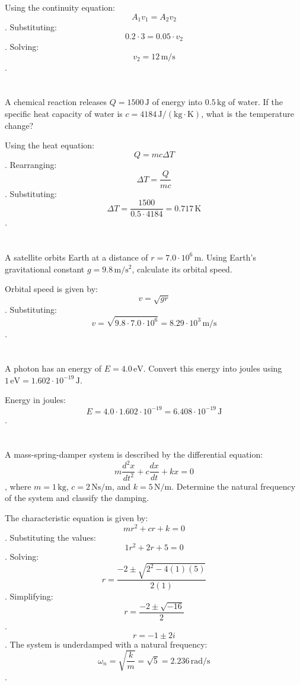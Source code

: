 \documentclass{article}
\begin{document}
Using the continuity equation: \[ A_1 v_1 = A_2 v_2 \]. Substituting: \[ 0.2 \cdot 3 = 0.05 \cdot v_2 \]. Solving: \[ v_2 = 12 \, \mathrm{m/s} \].

\section{}
A chemical reaction releases \( Q = 1500 \, \mathrm{J} \) of energy into \( 0.5 \, \mathrm{kg} \) of water. If the specific heat capacity of water is \( c = 4184 \, \mathrm{J/(kg \cdot K)} \), what is the temperature change?

Using the heat equation: \[ Q = m c \Delta T \]. Rearranging: \[ \Delta T = \frac{Q}{m c} \]. Substituting: \[ \Delta T = \frac{1500}{0.5 \cdot 4184} = 0.717 \, \mathrm{K} \].

\section{}
A satellite orbits Earth at a distance of \( r = 7.0 \cdot 10^6 \, \mathrm{m} \). Using Earth's gravitational constant \( g = 9.8 \, \mathrm{m/s^2} \), calculate its orbital speed.

Orbital speed is given by: \[ v = \sqrt{g r} \]. Substituting: \[ v = \sqrt{9.8 \cdot 7.0 \cdot 10^6} = 8.29 \cdot 10^3 \, \mathrm{m/s} \].

\section{}
A photon has an energy of \( E = 4.0 \, \mathrm{eV} \). Convert this energy into joules using \( 1 \, \mathrm{eV} = 1.602 \cdot 10^{-19} \, \mathrm{J} \).

Energy in joules: \[ E = 4.0 \cdot 1.602 \cdot 10^{-19} = 6.408 \cdot 10^{-19} \, \mathrm{J} \].

\section{}
A mass-spring-damper system is described by the differential equation: \[ m \frac{d^2 x}{dt^2} + c \frac{dx}{dt} + kx = 0 \], where \( m = 1 \, \mathrm{kg} \), \( c = 2 \, \mathrm{Ns/m} \), and \( k = 5 \, \mathrm{N/m} \). Determine the natural frequency of the system and classify the damping.

The characteristic equation is given by: \[ m r^2 + c r + k = 0 \]. Substituting the values: \[ 1 r^2 + 2 r + 5 = 0 \]. Solving: \[ r = \frac{-2 \pm \sqrt{2^2 - 4(1)(5)}}{2(1)} \]. Simplifying: \[ r = \frac{-2 \pm \sqrt{-16}}{2} \]. \[ r = -1 \pm 2i \]. The system is underdamped with a natural frequency: \[ \omega_n = \sqrt{\frac{k}{m}} = \sqrt{5} = 2.236 \, \mathrm{rad/s} \].
\end{document}

